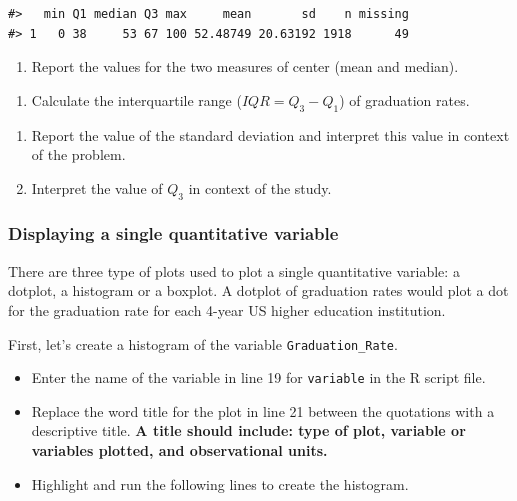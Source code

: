 \documentclass[
]{report}
\providecommand{\tightlist}{%
  \setlength{\itemsep}{0pt}\setlength{\parskip}{0pt}}
\begin{document}
\begin{verbatim}
#>   min Q1 median Q3 max     mean       sd    n missing
#> 1   0 38     53 67 100 52.48749 20.63192 1918      49
\end{verbatim}

\begin{enumerate}
\def\labelenumi{\arabic{enumi}.}
\setcounter{enumi}{1}
\tightlist
\item
  Report the values for the two measures of center (mean and median).
\end{enumerate}

\vspace{0.5in}

\begin{enumerate}
\def\labelenumi{\arabic{enumi}.}
\setcounter{enumi}{2}
\tightlist
\item
  Calculate the interquartile range (\(IQR = Q_3 - Q_1\)) of graduation rates.
\end{enumerate}

\vspace{0.5in}

\begin{enumerate}
\def\labelenumi{\arabic{enumi}.}
\setcounter{enumi}{3}
\item
  Report the value of the standard deviation and interpret this value in context of the problem.
  \vspace{0.8in}
\item
  Interpret the value of \(Q_3\) in context of the study.
\end{enumerate}

\vspace{0.8in}

\subsubsection*{Displaying a single quantitative variable}\label{displaying-a-single-quantitative-variable}

There are three type of plots used to plot a single quantitative variable: a dotplot, a histogram or a boxplot. A dotplot of graduation rates would plot a dot for the graduation rate for each 4-year US higher education institution.

First, let's create a histogram of the variable \texttt{Graduation\_Rate}.

\begin{itemize}
\item
  Enter the name of the variable in line 19 for \texttt{variable} in the R script file.
\item
  Replace the word title for the plot in line 21 between the quotations with a descriptive title. \textbf{A title should include: type of plot, variable or variables plotted, and observational units.}
\item
  Highlight and run the following lines to create the histogram.
\end{itemize}
\end{document}
